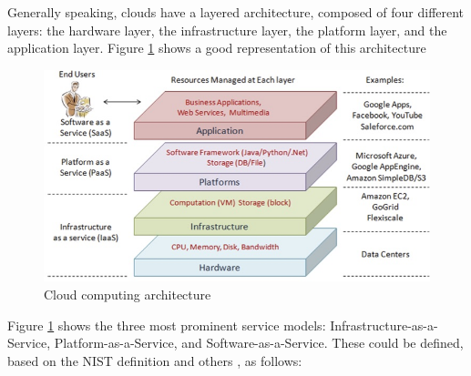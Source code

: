 		Generally speaking, clouds have a layered architecture, composed of four different layers: the hardware layer, the infrastructure layer, the platform layer, and the application layer. Figure \ref{fig:cloud_architechture} shows a good representation of this architecture

		\begin{figure}[h]
			\centerline{\includegraphics[scale=0.5]{images/cloud_architecture.jpg}}
			\caption {Cloud computing architecture \cite{zhang_cloud_2010}}
			\label{fig:cloud_architechture}
		\end{figure}

		Figure \ref{fig:cloud_architechture} shows the three most prominent service models: Infrastructure-as-a-Service, Platform-as-a-Service, and Software-as-a-Service. These could be defined, based on the NIST definition \cite{mell_nist_2011} and others \cite{zhang_cloud_2010}\cite{hofer_cloud_2011}\cite{lewis_basics_2010}, as follows:

